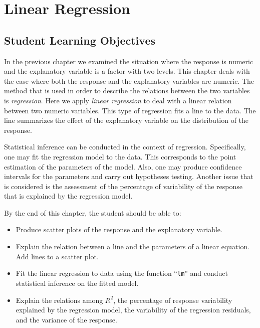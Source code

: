 \documentclass[]{krantz}
\theoremstyle{definition}
\theoremstyle{definition}
\theoremstyle{definition}
\theoremstyle{remark}
\begin{document}
\hypertarget{ChapRegression}{%
\chapter{Linear Regression}\label{ChapRegression}}

\hypertarget{student-learning-objectives-8}{%
\section{Student Learning Objectives}\label{student-learning-objectives-8}}

In the previous chapter we examined the situation where the response is
numeric and the explanatory variable is a factor with two levels. This
chapter deals with the case where both the response and the explanatory
variables are numeric. The method that is used in order to describe the
relations between the two variables is \emph{regression}. Here we apply
\emph{linear regression} to deal with a linear relation between two numeric
variables. This type of regression fits a line to the data. The line
summarizes the effect of the explanatory variable on the distribution of
the response.

Statistical inference can be conducted in the context of regression.
Specifically, one may fit the regression model to the data. This
corresponds to the point estimation of the parameters of the model.
Also, one may produce confidence intervals for the parameters and carry
out hypotheses testing. Another issue that is considered is the
assessment of the percentage of variability of the response that is
explained by the regression model.

By the end of this chapter, the student should be able to:

\begin{itemize}
\item
  Produce scatter plots of the response and the explanatory variable.
\item
  Explain the relation between a line and the parameters of a linear
  equation. Add lines to a scatter plot.
\item
  Fit the linear regression to data using the function ``\texttt{lm}'' and
  conduct statistical inference on the fitted model.
\item
  Explain the relations among \(R^2\), the percentage of response
  variability explained by the regression model, the variability of
  the regression residuals, and the variance of the response.
\end{itemize}
\end{document}
